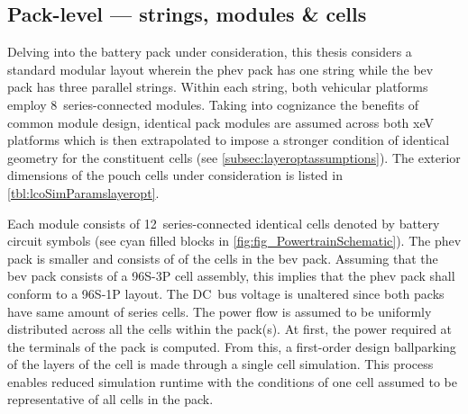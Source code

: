 \subsection{Pack-level --- strings, modules \& cells}

Delving  into the  battery pack  under  consideration, this  thesis considers  a
standard  modular  layout wherein  the  \gls{phev}  pack  has one  string  while
the  \gls{bev}  pack  has  three  parallel strings.  Within  each  string,  both
vehicular platforms  employ 8~series-connected  modules. Taking  into cognizance
the  benefits  of common  module  design,  identical  pack modules  are  assumed
across  both  \gls{xeV}  platforms  which  is  then  extrapolated  to  impose  a
stronger  condition  of  identical  geometry  for  the  constituent  cells  (see
\cref{subsec:layeroptassumptions}). The  exterior dimensions of the  pouch cells
under consideration is listed in \cref{tbl:lcoSimParamslayeropt}.

Each module consists  of 12~series-connected identical cells  denoted by battery
circuit symbols (see cyan  filled blocks in \cref{fig:fig_PowertrainSchematic}).
The \gls{phev}  pack is smaller and  consists of  of  the cells in
the \gls{bev} pack. Assuming that the \gls{bev} pack consists of a \mbox{96S-3P}
cell  assembly,  this implies  that  the  \gls{phev}  pack  shall conform  to  a
\mbox{96S-1P} layout. The DC~bus voltage is unaltered since both packs have same
amount of  series cells. The power  flow is assumed to  be uniformly distributed
across all  the cells within  the pack(s). At first,  the power required  at the
terminals of the  pack is computed. From this, a  first-order design ballparking
of the layers of the cell is made through a single cell simulation. This process
enables reduced simulation runtime with the conditions of one cell assumed to be
representative of all cells in the pack.



